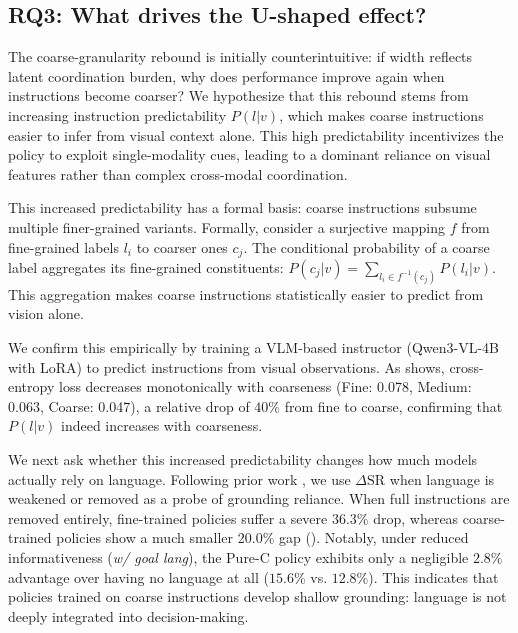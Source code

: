 \documentclass[11pt]{article}
\begin{document}



\subsection{RQ3: What drives the U-shaped effect?}
\label{sec:rq3_u_shape}

The coarse-granularity rebound is initially counterintuitive: if width reflects latent coordination burden, why does performance improve again when instructions become coarser? We hypothesize that this rebound stems from increasing instruction predictability $P(l|v)$, which makes coarse instructions easier to infer from visual context alone. This high predictability incentivizes the policy to exploit single-modality cues, leading to a dominant reliance on visual features rather than complex cross-modal coordination.

This increased predictability has a formal basis: coarse instructions subsume multiple finer-grained variants. Formally, consider a surjective mapping $f$ from fine-grained labels $l_i$ to coarser ones $c_j$. The conditional probability of a coarse label aggregates its fine-grained constituents: $P(c_j | v) = \sum_{l_i \in f^{-1}(c_j)} P(l_i | v)$. This aggregation makes coarse instructions statistically easier to predict from vision alone.

We confirm this empirically by training a VLM-based instructor (Qwen3-VL-4B with LoRA) to predict instructions from visual observations. As  shows, cross-entropy loss decreases monotonically with coarseness (Fine: 0.078, Medium: 0.063, Coarse: 0.047), a relative drop of $40\%$ from fine to coarse, confirming that $P(l|v)$ indeed increases with coarseness.




We next ask whether this increased predictability changes how much models actually rely on language. Following prior work \citep{fei2025liberoplus}, we use $\Delta \mathrm{SR}$ when language is weakened or removed as a probe of grounding reliance. When full instructions are removed entirely, fine-trained policies suffer a severe $36.3\%$ drop, whereas coarse-trained policies show a much smaller $20.0\%$ gap (). Notably, under reduced informativeness (\textit{w/ goal lang}), the Pure-C policy exhibits only a negligible $2.8\%$ advantage over having no language at all ($15.6\%$ vs. $12.8\%$). This indicates that policies trained on coarse instructions develop shallow grounding: language is not deeply integrated into decision-making.
\end{document}
